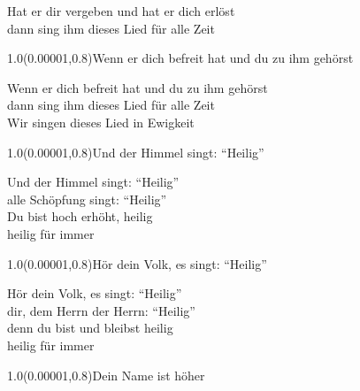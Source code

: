 \documentclass[aspectratio=169]{beamer}
\begin{document}
\begin{frame}
\centering
\color{white}
\huge{Hat er dir vergeben und hat er dich erlöst} \\
\huge{dann sing ihm dieses Lied für alle Zeit} \\

\begin{textblock}{1.0}(0.00001,0.8)\color{gray}\normalsize{Wenn er dich befreit hat und du zu ihm gehörst}\end{textblock}
\end{frame}

\begin{frame}
\centering
\color{white}
\huge{Wenn er dich befreit hat und du zu ihm gehörst} \\
\huge{dann sing ihm dieses Lied für alle Zeit} \\
\huge{Wir singen dieses Lied in Ewigkeit} \\

\begin{textblock}{1.0}(0.00001,0.8)\color{gray}\normalsize{Und der Himmel singt: “Heilig”}\end{textblock}
\end{frame}

\begin{frame}
\centering
\color{white}
\huge{Und der Himmel singt: “Heilig”} \\
\huge{alle Schöpfung singt: “Heilig”} \\
\huge{Du bist hoch erhöht, heilig} \\
\huge{heilig für immer} \\

\begin{textblock}{1.0}(0.00001,0.8)\color{gray}\normalsize{Hör dein Volk, es singt: “Heilig”}\end{textblock}
\end{frame}

\begin{frame}
\centering
\color{white}
\huge{Hör dein Volk, es singt: “Heilig”} \\
\huge{dir, dem Herrn der Herrn: “Heilig”} \\
\huge{denn du bist und bleibst heilig} \\
\huge{heilig für immer} \\

\begin{textblock}{1.0}(0.00001,0.8)\color{gray}\normalsize{Dein Name ist höher}\end{textblock}
\end{frame}
\end{document}

